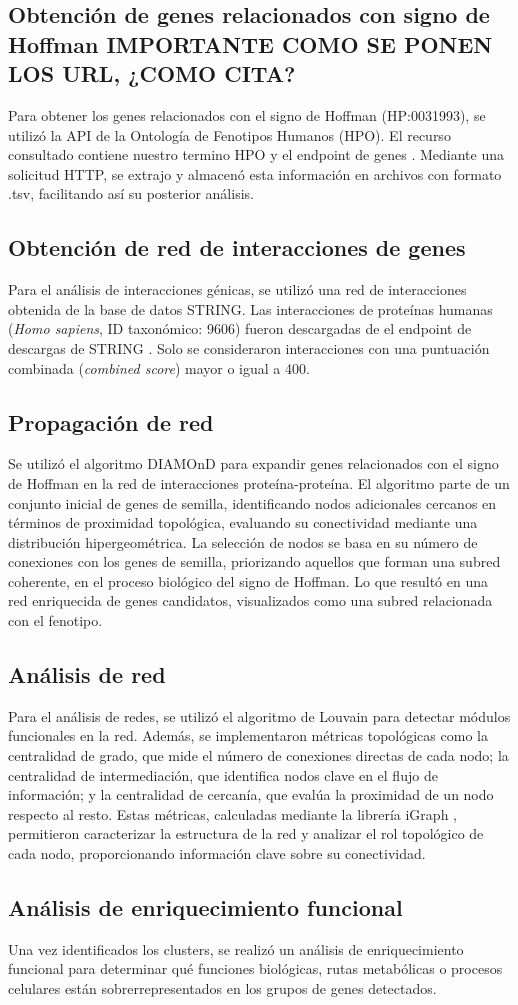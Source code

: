 \subsection{Obtención de genes relacionados con signo de Hoffman IMPORTANTE COMO SE PONEN LOS URL, ¿COMO CITA? }

Para obtener los genes relacionados con el signo de Hoffman (HP:0031993), se utilizó la API de la Ontología de Fenotipos Humanos (HPO). El recurso consultado contiene nuestro termino HPO y el endpoint de genes \cite{ontology_api}. Mediante una solicitud HTTP, se extrajo y almacenó esta información en archivos con formato .tsv, facilitando así su posterior análisis. 


\subsection{Obtención de red de interacciones de genes}

Para el análisis de interacciones génicas, se utilizó una red de interacciones obtenida de la base de datos STRING. Las interacciones de proteínas humanas (\textit{Homo sapiens}, ID taxonómico: 9606) fueron descargadas de el endpoint de descargas de STRING \cite{stringdb_human_proteins}. Solo se consideraron interacciones con una puntuación combinada (\textit{combined score}) mayor o igual a 400.


\subsection{Propagación de red}

Se utilizó el algoritmo DIAMOnD para expandir genes relacionados con el signo de Hoffman en la red de interacciones proteína-proteína. El algoritmo parte de un conjunto inicial de genes de semilla, identificando nodos adicionales cercanos en términos de proximidad topológica, evaluando su conectividad mediante una distribución hipergeométrica. La selección de nodos se basa en su número de conexiones con los genes de semilla, priorizando aquellos que forman una subred coherente, en el proceso biológico del signo de Hoffman. Lo que resultó en una red enriquecida de genes candidatos, visualizados como una subred relacionada con el fenotipo.
\subsection{Análisis de red}

Para el análisis de redes, se utilizó el algoritmo de Louvain para detectar módulos funcionales en la red. Además, se implementaron métricas topológicas como la centralidad de grado, que mide el número de conexiones directas de cada nodo; la centralidad de intermediación, que identifica nodos clave en el flujo de información; y la centralidad de cercanía, que evalúa la proximidad de un nodo respecto al resto. Estas métricas, calculadas mediante la librería iGraph \cite{Csardi2006}, permitieron caracterizar la estructura de la red y analizar el rol topológico de cada nodo, proporcionando información clave sobre su conectividad.

\subsection{Análisis de enriquecimiento funcional}

Una vez identificados los clusters, se realizó un análisis de enriquecimiento funcional para determinar qué funciones biológicas, rutas metabólicas o procesos celulares están sobrerrepresentados en los grupos de genes detectados.